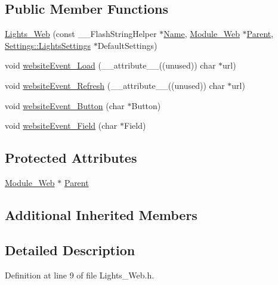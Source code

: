 \subsection*{Public Member Functions}
\begin{DoxyCompactItemize}
\item 
\hyperlink{class_lights___web_acaf75aed6b86ca10828c967049c59383}{Lights\+\_\+\+Web} (const \+\_\+\+\_\+\+Flash\+String\+Helper $\ast$\hyperlink{class_common_aeea91a726dbe988e515057b32ba0726f}{Name}, \hyperlink{class_module___web}{Module\+\_\+\+Web} $\ast$\hyperlink{class_lights___web_a83a1b2c2358a647f81c29e5e2ce5f6a7}{Parent}, \hyperlink{struct_settings_1_1_lights_settings}{Settings\+::\+Lights\+Settings} $\ast$Default\+Settings)
\item 
void \hyperlink{class_lights___web_afab1fbd6391d25ab5f382b89d4a02b5e}{website\+Event\+\_\+\+Load} (\+\_\+\+\_\+attribute\+\_\+\+\_\+((unused)) char $\ast$url)
\item 
void \hyperlink{class_lights___web_af46bb9ec74ecb0f45b465c2722b9b18a}{website\+Event\+\_\+\+Refresh} (\+\_\+\+\_\+attribute\+\_\+\+\_\+((unused)) char $\ast$url)
\item 
void \hyperlink{class_lights___web_a2437d22a7e8b027c4d08d209675f5db9}{website\+Event\+\_\+\+Button} (char $\ast$Button)
\item 
void \hyperlink{class_lights___web_a8e4f0fc6e2cba4303c306910b9c9ac86}{website\+Event\+\_\+\+Field} (char $\ast$Field)
\end{DoxyCompactItemize}
\subsection*{Protected Attributes}
\begin{DoxyCompactItemize}
\item 
\hyperlink{class_module___web}{Module\+\_\+\+Web} $\ast$ \hyperlink{class_lights___web_a83a1b2c2358a647f81c29e5e2ce5f6a7}{Parent}
\end{DoxyCompactItemize}
\subsection*{Additional Inherited Members}


\subsection{Detailed Description}


Definition at line 9 of file Lights\+\_\+\+Web.\+h.



